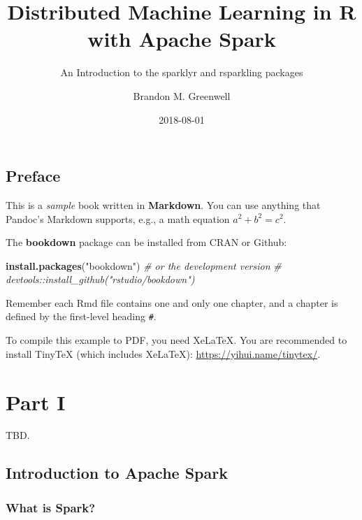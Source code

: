 \documentclass[]{book}
\title{Distributed Machine Learning in R with Apache Spark}
\subtitle{An Introduction to the sparklyr and rsparkling packages}
\author{Brandon M. Greenwell}
\date{2018-08-01}
\newenvironment{Shaded}{\begin{snugshade}}{\end{snugshade}}
\newcommand{\CommentTok}[1]{\textcolor[rgb]{0.56,0.35,0.01}{\textit{#1}}}
\newcommand{\KeywordTok}[1]{\textcolor[rgb]{0.13,0.29,0.53}{\textbf{#1}}}
\newcommand{\NormalTok}[1]{#1}
\newcommand{\StringTok}[1]{\textcolor[rgb]{0.31,0.60,0.02}{#1}}
\theoremstyle{definition}
\theoremstyle{definition}
\theoremstyle{definition}
\theoremstyle{remark}
\begin{document}
\maketitle

{
\setcounter{tocdepth}{1}
\tableofcontents
}
\hypertarget{preface}{%
\chapter*{Preface}\label{preface}}

This is a \emph{sample} book written in \textbf{Markdown}. You can use
anything that Pandoc's Markdown supports, e.g., a math equation
\(a^2 + b^2 = c^2\).

The \textbf{bookdown} package can be installed from CRAN or Github:

\begin{Shaded}
\begin{Highlighting}[]
\KeywordTok{install.packages}\NormalTok{(}\StringTok{"bookdown"}\NormalTok{)}
\CommentTok{# or the development version}
\CommentTok{# devtools::install_github("rstudio/bookdown")}
\end{Highlighting}
\end{Shaded}

Remember each Rmd file contains one and only one chapter, and a chapter
is defined by the first-level heading \texttt{\#}.

To compile this example to PDF, you need XeLaTeX. You are recommended to
install TinyTeX (which includes XeLaTeX):
\url{https://yihui.name/tinytex/}.

\hypertarget{part-part-i}{%
\part{Part I}\label{part-part-i}}

TBD.

\hypertarget{intro}{%
\chapter{Introduction to Apache Spark}\label{intro}}

\hypertarget{what-is-spark}{%
\section{What is Spark?}\label{what-is-spark}}
\end{document}
